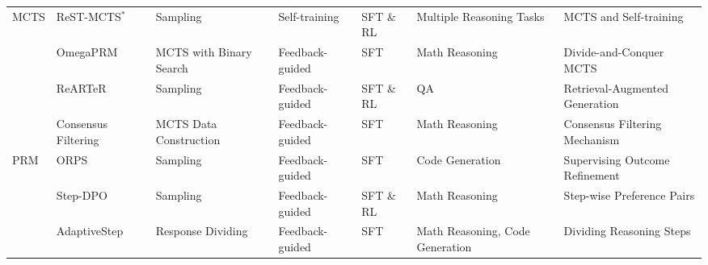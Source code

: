 \begin{table*}[t!]
{\begin{tabular}{lllllll}
                          \hline
\multirow{4}{*}{MCTS}     & ReST-MCTS$^{*}$\cite{zhang2024rest}              & Sampling                       & Self-training         & SFT \& RL      & Multiple Reasoning Tasks        & MCTS and Self-training        \\
                          & \cellcolor[rgb]{ .949,  .949,  .949}OmegaPRM\cite{luo2024improve}                 & \cellcolor[rgb]{ .949,  .949,  .949}MCTS with Binary Search      & \cellcolor[rgb]{ .949,  .949,  .949}Feedback-guided       & \cellcolor[rgb]{ .949,  .949,  .949}SFT            & \cellcolor[rgb]{ .949,  .949,  .949}Math Reasoning                    & \cellcolor[rgb]{ .949,  .949,  .949}Divide-and-Conquer MCTS        \\
                          & ReARTeR\cite{sun2025rearter}                  & Sampling                       & Feedback-guided       & SFT \& RL      & QA                                & Retrieval-Augmented   Generation \\
                          & \cellcolor[rgb]{ .949,  .949,  .949}Consensus Filtering\cite{zhang2025lessons}      & \cellcolor[rgb]{ .949,  .949,  .949}MCTS Data   Construction       & \cellcolor[rgb]{ .949,  .949,  .949}Feedback-guided       & \cellcolor[rgb]{ .949,  .949,  .949}SFT            & \cellcolor[rgb]{ .949,  .949,  .949}Math Reasoning                    & \cellcolor[rgb]{ .949,  .949,  .949}Consensus Filtering Mechanism  \\
                          \hline
\multirow{3}{*}{PRM}      & ORPS\cite{yu2024outcome}                     & Sampling                       & Feedback-guided       & SFT            & Code Generation                   & Supervising Outcome Refinement \\
                          & \cellcolor[rgb]{ .949,  .949,  .949}Step-DPO\cite{lai2024step}                 & \cellcolor[rgb]{ .949,  .949,  .949}Sampling                       & \cellcolor[rgb]{ .949,  .949,  .949}Feedback-guided       & \cellcolor[rgb]{ .949,  .949,  .949}SFT \& RL      & \cellcolor[rgb]{ .949,  .949,  .949}Math Reasoning                    & \cellcolor[rgb]{ .949,  .949,  .949}Step-wise Preference Pairs     \\
                          & AdaptiveStep\cite{liu2025adaptivestep}             & Response Dividing              & Feedback-guided       & SFT            & Math Reasoning, Code Generation & Dividing   Reasoning Steps \\
\bottomrule[1.2pt]
\end{tabular}}
\label{table:PRM}
\end{table*}





